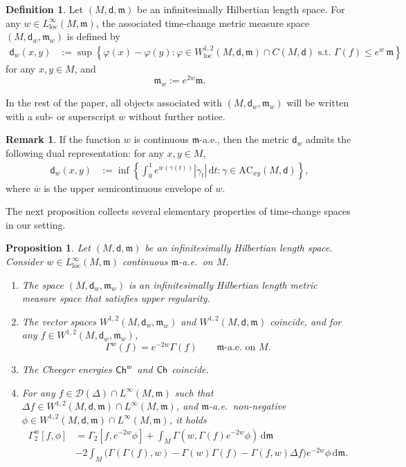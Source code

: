 \documentclass[10pt]{article}
\newcommand{\m}{\mathfrak{m}}
\newcommand{\M}{{\mathit{M}}}
\renewcommand{\d}{\,\mathrm{d}}
\newcommand{\D}{\mathscr{D}}
\newcommand{\loc}{{\mathrm{loc}}}
\newcommand{\dist}{\mathsf{d}}
\newcommand{\Ch}{{\sf Ch}}
\theoremstyle{plain}
\newtheorem{proposition}[theorem]{Proposition}
\theoremstyle{definition}
\newtheorem{definition}[theorem]{Definition}
\newtheorem{remark}[theorem]{Remark}
\newcommand{\Sob}{W^{1,2}(M,\dist,\m)}
\newcommand{\Sobloc}{W^{1,2}_{\text{loc}}(M,\dist,\m)}
\begin{document}
\begin{definition}
Let $(M,\dist,\m)$ be an infinitesimally Hilbertian length space. For any $w \in L^\infty_{\loc}(M,\m)$, the associated time-change metric measure space $ (M,\dist_w,\m_w)$ is defined by
\begin{align*}
\dist_w(x,y) & := \sup \left\{ \varphi(x) - \varphi(y) : \varphi \in \Sobloc \cap C(M,\dist) \text{ s.t.~} \Gamma(f) \le e^w \, \m\right\}
\end{align*}
for any $x, y \in M$, and 
$$\m_w  := e^{2w} \m.$$
\end{definition}

In the rest of the paper, all objects associated with $(M,\dist_w,\m_w)$ will be written with a sub- or superscript $w$ without further notice.


\begin{remark}
If the function $w$ is continuous $\m$-a.e., then the metric $\dist_w$ admits the following dual representation: for any $x,y \in M$,
\begin{align*}
\dist_w(x,y) & := \inf \left\{\int_0^1 e^{\bar{w}(\gamma(t))}|\dot{\gamma}_t| \d t : \gamma \in \mathrm{AC}_{xy}(M,\dist)\right\},
\end{align*}
where $\bar{w}$ is the upper semicontinuous envelope of $w$.
\end{remark}

The next proposition collects several elementary properties of time-change spaces in our setting.

\begin{proposition}
Let $(M,\dist,\m)$ be an infinitesimally Hilbertian length space. Consider $w \in L^\infty_{\text{loc}}(M,\m)$  continuous $\m$-a.e.~on $M$.

\begin{enumerate}
\item The space $(M,\dist_w,\m_w)$ is an infinitesimally Hilbertian length metric measure space that satisfies upper regularity.

\item The vector spaces $W^{1,2}(M,\dist_w,\m_w)$ and $\Sob$ coincide, and for any $f \in W^{1,2}(M,\dist_w,\m_w)$,
\begin{equation*}
    \Gamma^w(f) = e^{-2w} \Gamma(f) \qquad \text{$\m$-a.e.~on $M$.}
    \end{equation*}
   
\item The Cheeger energies $\Ch^w$ and $\Ch$ coincide.

\item For any $f \in \D(\Delta)\cap L^\infty(\M,\m)$ such that $\Delta f \in \Sob \cap L^\infty(\M,\m)$, and $\m$-a.e.~non-negative $\phi \in \Sob\cap L^\infty(\M,\m)$, it holds
\begin{align*}
\Gamma_2^w[f,\phi]  
& =  \Gamma_2[f,e^{-2w}\phi]  + \int_M \Gamma(w,\Gamma(f)e^{-2w} \phi) \d \m \\
& - 2 \int_M\big( \Gamma(\Gamma(f),w) - \Gamma(w)\Gamma(f) - \Gamma(f,w)\Delta f \big) e^{-2w} \phi \d \m.
\end{align*}
\end{enumerate}
\end{proposition}
\end{document}
